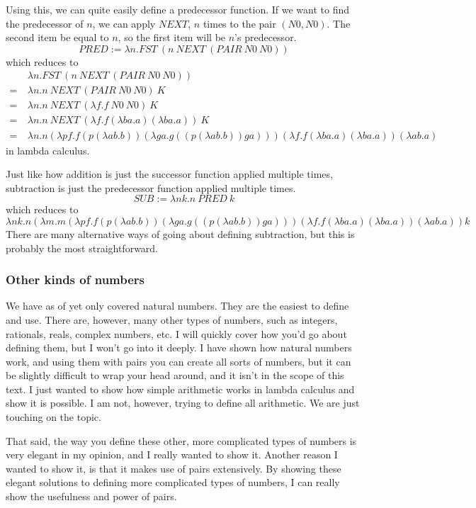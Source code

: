 \documentclass[11pt]{article}
\begin{document}
Using this, we can quite easily define a predecessor function. If we want to
find the predecessor of \(n\), we can apply \(NEXT\), \(n\) times to the pair
\((N0,N0)\). The second item be equal to \(n\), so the first item will be
\(n\)'s predecessor.
\[PRED:=\lambda n.FST\ (n\ NEXT\ (PAIR\ N0\ N0))\]
which reduces to
\begin{align*}
	&\lambda n.FST\ (n\ NEXT\ (PAIR\ N0\ N0))\\
	=\ &\lambda n.n\ NEXT\ (PAIR\ N0\ N0)\ K\\
	=\ &\lambda n.n\ NEXT\ (\lambda f.f\ N0\ N0)\ K\\
	=\ &\lambda n.n\ NEXT\ (\lambda f.f(\lambda ba.a)(\lambda ba.a))\ K\\
	=\ &\lambda n.n
		(\lambda pf.f(p(\lambda ab.b))(\lambda ga.g((p(\lambda ab.b))ga)))
		(\lambda f.f(\lambda ba.a)(\lambda ba.a))
		(\lambda ab.a)
\end{align*}
in lambda calculus.

Just like how addition is just the successor function applied multiple times,
subtraction is just the predecessor function applied multiple times.
\[SUB:=\lambda nk.n\ PRED\ k\]
which reduces to
\[
	\lambda nk.n
		(\lambda m.m
			(\lambda pf.f(p(\lambda ab.b))(\lambda ga.g((p(\lambda ab.b))ga)))
			(\lambda f.f(\lambda ba.a)(\lambda ba.a))
			(\lambda ab.a))k
\]
There are many alternative ways of going about defining subtraction, but this
is probably the most straightforward.

\subsubsection{Other kinds of numbers}

We have as of yet only covered natural numbers. They are the easiest to define
and use. There are, however, many other types of numbers, such as integers,
rationals, reals, complex numbers, etc. I will quickly cover how you'd go about
defining them, but I won't go into it deeply. I have shown how natural numbers
work, and using them with pairs you can create all sorts of numbers, but it can
be slightly difficult to wrap your head around, and it isn't in the scope of
this text. I just wanted to show how simple arithmetic works in lambda calculus
and show it is possible. I am not, however, trying to define all arithmetic. We
are just touching on the topic.

That said, the way you define these other, more complicated types of numbers is
very elegant in my opinion, and I really wanted to show it. Another reason I
wanted to show it, is that it makes use of pairs extensively. By showing these
elegant solutions to defining more complicated types of numbers, I can really
show the usefulness and power of pairs.
\end{document}
